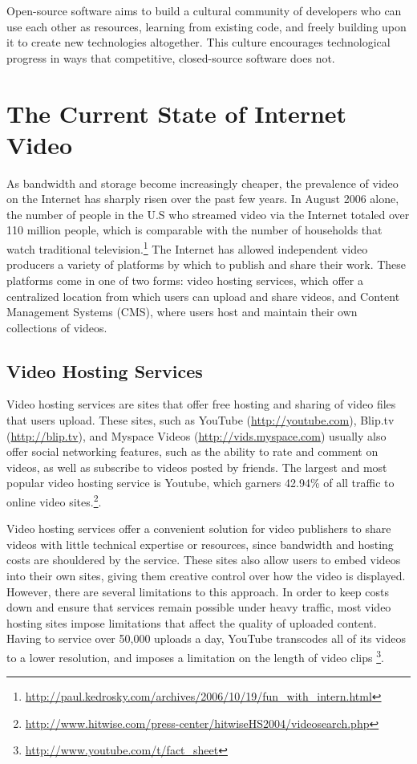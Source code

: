 \documentclass[a4paper,12pt]{report}
\begin{document}
Open-source software aims to build a cultural community of developers who can use each other as resources, learning from existing code, and freely building upon it to create new technologies altogether.
This culture encourages technological progress in ways that competitive, closed-source software does not. 

\section{The Current State of Internet Video}
As bandwidth and storage become increasingly cheaper, the prevalence of video on the Internet has sharply risen over the past few years. 
In August 2006 alone, the number of people in the U.S who streamed video 
via the Internet totaled over 110 million people, which is comparable 
with the number of households that watch traditional television.\footnote{\url{http://paul.kedrosky.com/archives/2006/10/19/fun\_with\_intern.html}}
The Internet has allowed independent video producers a variety of platforms by which to publish and share their work. These platforms come 
in one of two forms: video hosting services, which offer a centralized location from which users can upload and share videos, and Content Management Systems (CMS), where users host and maintain their own collections of videos.

\subsection{Video Hosting Services}
Video hosting services are sites that offer free hosting and sharing of video files that users upload.
These sites, such as YouTube (\url{http://youtube.com}), Blip.tv (\url{http://blip.tv}), and Myspace Videos (\url{http://vids.myspace.com}) usually also offer social networking features, such as the ability to rate and comment on videos, as well as subscribe to videos posted by friends.
The largest and most popular video hosting service is Youtube, which garners 42.94\% of all traffic to online video sites.\footnote{\url{http://www.hitwise.com/press-center/hitwiseHS2004/videosearch.php}}. 

Video hosting services offer a convenient solution for video publishers 
to share videos with little technical expertise or resources, since bandwidth and hosting costs are shouldered by the service. These sites also allow users to embed videos into their own sites, giving them creative control over how the video is displayed. However, there are several limitations to this approach. In order to keep costs down and ensure that services remain possible under heavy traffic, most video hosting sites impose limitations that affect the quality of uploaded content. Having to service over 50,000 uploads a day, YouTube transcodes all of its videos to a lower resolution, and imposes a limitation on the length of video clips \footnote{\url{http://www.youtube.com/t/fact\_sheet}}. 
\end{document}
